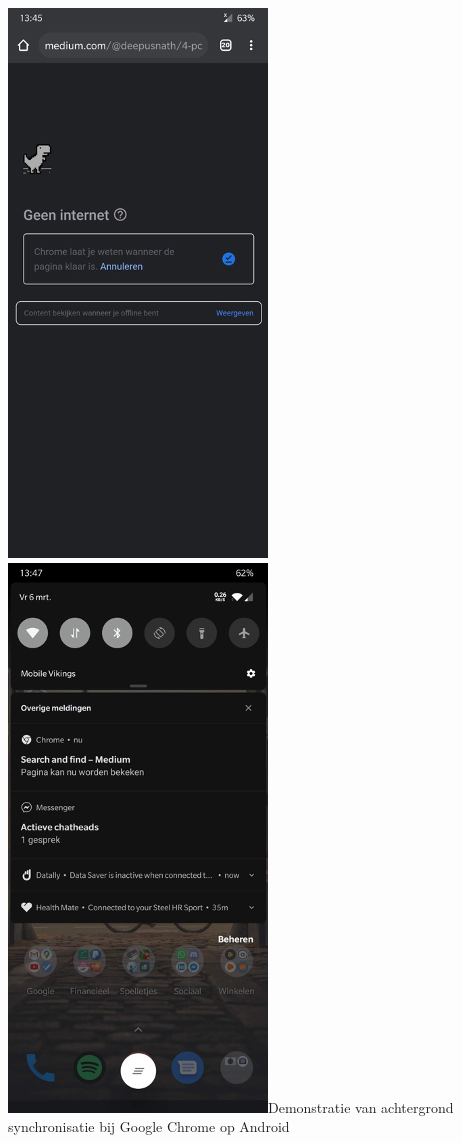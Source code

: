 \includegraphics{./img/backSync1.png}{}
\includegraphics{./img/backSync2.png}{Demonstratie van achtergrond synchronisatie bij Google Chrome op Android}


